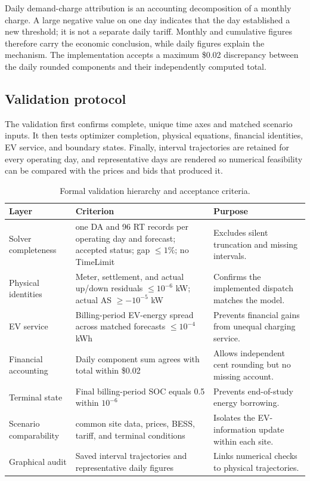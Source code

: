 \documentclass[final,5p,times]{elsarticle}
\begin{document}
Daily demand-charge attribution is an accounting decomposition of a monthly charge. A large negative value on one day indicates that the day established a new threshold; it is not a separate daily tariff. Monthly and cumulative figures therefore carry the economic conclusion, while daily figures explain the mechanism. The implementation accepts a maximum \$0.02 discrepancy between the daily rounded components and their independently computed total.

\subsection{Validation protocol}
The validation first confirms complete, unique time axes and matched scenario
inputs. It then tests optimizer completion, physical equations, financial
identities, EV service, and boundary states. Finally, interval trajectories are retained for every operating day, and representative days are rendered so numerical feasibility can be compared with the prices and bids that produced it.

\begin{table}[!t]
\centering
\caption{Formal validation hierarchy and acceptance criteria.}
\label{tab:validation_protocol}
\scriptsize
\begin{tabularx}{\textwidth}{@{}p{}p{}X@{}}
\toprule
Layer & Criterion & Purpose \\
\midrule
Solver completeness & one DA and 96 RT records per operating day and forecast; accepted status; gap $\le1\%$; no TimeLimit & Excludes silent truncation and missing intervals.\\
Physical identities & Meter, settlement, and actual up/down residuals $\le10^{-6}$ kW; actual AS $\ge-10^{-5}$ kW & Confirms the implemented dispatch matches the model.\\
EV service & Billing-period EV-energy spread across matched forecasts $\le10^{-4}$ kWh & Prevents financial gains from unequal charging service.\\
Financial accounting & Daily component sum agrees with total within \$0.02 & Allows independent cent rounding but no missing account.\\
Terminal state & Final billing-period SOC equals 0.5 within $10^{-6}$ & Prevents end-of-study energy borrowing.\\
Scenario comparability & common site data, prices, BESS, tariff, and terminal conditions & Isolates the EV-information update within each site.\\
Graphical audit & Saved interval trajectories and representative daily figures & Links numerical checks to physical trajectories.\\
\bottomrule
\end{tabularx}
\end{table}
\end{document}
